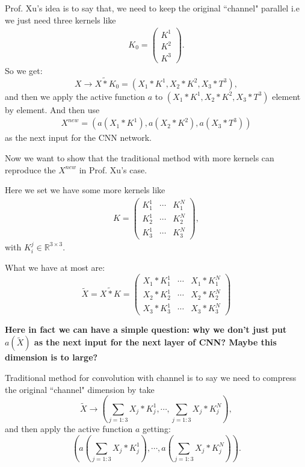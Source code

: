 Prof. Xu's idea is to say that, we need to keep the original ``channel" parallel i.e we just need three kernels like 
\begin{align}
	K_0 = \begin{pmatrix}
		K^1 \\ K^2 \\ K^3
	\end{pmatrix}.
\end{align} So we get:
\begin{equation}
X \to X\tilde{\ast} K_0 = (X_1 \ast K^1, X_2\ast K^2, X_3 \ast T^3),
\end{equation}
and then we apply the active function $a$ to $(X_1 \ast K^1, X_2\ast K^2, X_3 \ast T^3)$ element by element. And then use 
\begin{align}
	X^{new} = (a(X_1 \ast K^1), a(X_2\ast K^2), a(X_3 \ast T^3))
\end{align} as the next input for the CNN network.

Now we want to show that the traditional method with more kernels can reproduce the $X^{new}$ in Prof. Xu's case.

Here we set we have some more kernels like 
\begin{align}
	K = 
	\begin{pmatrix}
		K_1^1 & \cdots & K_1^N \\
		K_2^1 & \cdots & K_2^N \\
		K_3^1 & \cdots & K_3^N 
	\end{pmatrix},
\end{align} with $K_i^j \in \mathbb{R}^{3\times3}$.

What we have at most are:
\begin{equation}
\tilde{X} = X\tilde{\ast} K =  \begin{pmatrix}
X_1 \ast K_1^1 & \cdots & X_1\ast K_1^N \\
X_2 \ast K_2^1 & \cdots & X_2\ast K_2^N \\
X_3 \ast K_3^1 & \cdots & X_3\ast K_3^N 
\end{pmatrix}
\end{equation}

{\bf Here in fact we can have a simple question: why we don't just put $a(\tilde{X})$ as the next input for the next layer of CNN? Maybe this dimension is to large?}

Traditional method for convolution with channel is to say we need to compress the original ``channel" dimension by take 
\begin{equation}
\tilde{X}  \to ( \sum_{j=1:3} X_j\ast K_{j}^1, \cdots, \sum_{j=1:3} X_j\ast K_{j}^N),
\end{equation} 
and then apply the active function $a$ getting:
\begin{equation}
(a( \sum_{j=1:3} X_j\ast K_{j}^1), \cdots, a(\sum_{j=1:3} X_j\ast K_{j}^N)).
\end{equation}

